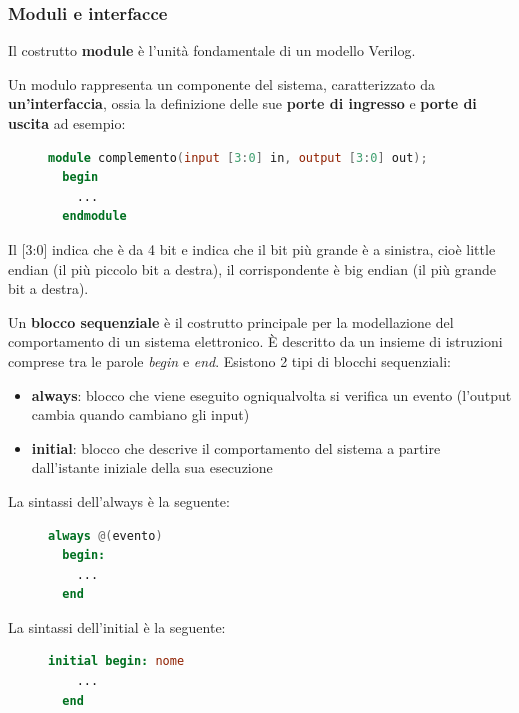 \documentclass[a4paper]{article}
\theoremstyle{break}
\theoremstyle{break}
\theoremstyle{break}
\theoremstyle{break}
\begin{document}
\subsubsection{Moduli e interfacce}
Il costrutto \textbf{module} è l'unità fondamentale di un modello Verilog.

Un modulo rappresenta un componente del sistema, caratterizzato da \textbf{un'interfaccia},
ossia la definizione delle sue \textbf{porte di ingresso} e \textbf{porte di uscita} ad
esempio:
\begin{figure}[H]
    \begin{lstlisting}[language=Verilog]
  module complemento(input [3:0] in, output [3:0] out);
  begin
    ...
  endmodule
    \end{lstlisting}   
\end{figure}
Il [3:0] indica che è da 4 bit e indica che il bit più grande è a sinistra,
cioè little endian (il più piccolo bit a destra), il corrispondente è
big endian (il più grande bit a destra).\\
\vspace{1em}

Un \textbf{blocco sequenziale} è il costrutto principale per la modellazione del
comportamento di un sistema elettronico. È descritto da un insieme di istruzioni comprese
tra le parole \emph{begin} e \emph{end}. Esistono 2 tipi di blocchi sequenziali:
\begin{itemize}
  \item \textbf{always}: blocco che viene eseguito ogniqualvolta si verifica un evento
    (l'output cambia quando cambiano gli input)
  \item \textbf{initial}: blocco che descrive il comportamento del sistema a partire
    dall'istante iniziale della sua esecuzione
\end{itemize}

La sintassi dell'always è la seguente:
\begin{figure}[H]
  \begin{lstlisting}[language=Verilog]
  always @(evento)
  begin:
    ...
  end
  \end{lstlisting}
\end{figure}
La sintassi dell'initial è la seguente:
\begin{figure}[H]
  \begin{lstlisting}[language=Verilog]
  initial begin: nome
    ...
  end
  \end{lstlisting}
\end{figure}
\end{document}
